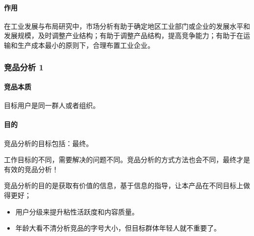 \documentclass[letterpaper,10pt,english]{sphinxmanual}
\begin{document}
\paragraph{作用}
\label{\detokenize{chapter_knowledge/market_analysis:id5}}
在工业发展与布局研究中，市场分析有助于确定地区工业部门或企业的发展水平和发展规模，及时调整产业结构；有助于调整产品结构，提高竞争能力；有助于在运输和生产成本最小的原则下，合理布置工业企业。


\subsubsection{竞品分析 1\sphinxfootnotemark[517]}
\label{\detokenize{chapter_knowledge/goods_analysis:id1}}\label{\detokenize{chapter_knowledge/goods_analysis::doc}}%
\begin{footnotetext}[517]\sphinxAtStartFootnote
{}
%
\end{footnotetext}\ignorespaces 

\paragraph{竞品本质}
\label{\detokenize{chapter_knowledge/goods_analysis:id2}}
目标用户是同一群人或者组织。%
\begin{footnote}[518]\sphinxAtStartFootnote
{}
%
\end{footnote}


\paragraph{目的}
\label{\detokenize{chapter_knowledge/goods_analysis:id3}}
竞品分析的目标包括：最终。%
\begin{footnote}[519]\sphinxAtStartFootnote
{}
%
\end{footnote}
工作目标的不同，需要解决的问题不同。竞品分析的方式方法也会不同，最终才是有效的竞品分析！

竞品分析的目的是获取有价值的信息，基于信息的指导，让本产品在不同目标上做得更好；
\begin{itemize}
\item {} 
用户分级来提升粘性活跃度和内容质量。

\item {} 
年龄大看不清分析竞品的字号大小，但目标群体年轻人就不重要了。

\end{itemize}
\end{document}
